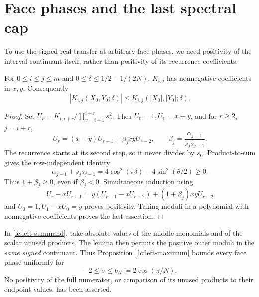 \section{Face phases and the last spectral cap}\label{lc:phases}
To use the signed real transfer at arbitrary face phases, we need
positivity of the interval continuant itself, rather than positivity
of its recurrence coefficients.

\begin{lemma}\label{lc:tail-positive}
For \(0\le i\le j\le m\) and
\(0\le\delta\le1/2-1/(2N)\), \(K_{i,j}\) has nonnegative coefficients
in \(x,y\). Consequently
\[
 |K_{i,j}(X_0,Y_0;\delta)|
                 \le K_{i,j}(|X_0|,|Y_0|;\delta).
\]
\end{lemma}
\begin{proof}
Set \(U_r=K_{i,i+r}/\prod_{v=i+1}^{i+r}s_v^2\).
Then \(U_0=1,U_1=x+y\), and for \(r\ge2\), \(j=i+r\),
\[
 U_r=(x+y)U_{r-1}+\beta_jxyU_{r-2},\qquad
                       \beta_j=\frac{\alpha_{j-1}}{s_js_{j-1}}.
\]
The recurrence starts at its second step, so it never divides by \(s_0\).
Product-to-sum gives the row-independent identity
\[
 \alpha_{j-1}+s_js_{j-1}
             =4\cos^2(\pi\delta)-4\sin^2(\theta/2)\ge0.
\]
Thus \(1+\beta_j\ge0\), even if \(\beta_j<0\). Simultaneous induction
using
\[
 U_r-xU_{r-1}
   =y(U_{r-1}-xU_{r-2})+(1+\beta_j)xyU_{r-2}
\]
and \(U_0=1,U_1-xU_0=y\) proves positivity. Taking moduli in a
polynomial with nonnegative coefficients proves the last assertion.
\end{proof}

In \eqref{lc:left-summand}, take absolute values of the middle
monomials and of the scalar unused products. The lemma then permits
the positive outer moduli in the \emph{same signed} continuant.
Thus Proposition~\ref{lc:left-maximum} bounds every face phase
uniformly for
\[
                       -2\le\sigma\le b_N:=2\cos(\pi/N).
\]
No positivity of the full numerator, or comparison of its unused
products to their endpoint values, has been asserted.


